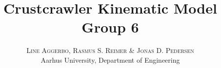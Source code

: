 

\title{
	\vspace{-15mm}
	\fontsize{24pt}{10pt}
	\selectfont
	\textbf{Crustcrawler Kinematic Model \\ \vspace{5mm} \Large Group 6}
}

\author{
	\large
	\textsc{Line Aggerbo, Rasmus S. Reimer \& Jonas D. Pedersen}\\[2mm]
	\normalsize Aarhus University, Department of Engineering \\
	\vspace{-5mm}
}
\date{}




\maketitle
\thispagestyle{fancy} %
\raggedright












\begingroup
	\raggedright
	
\endgroup


